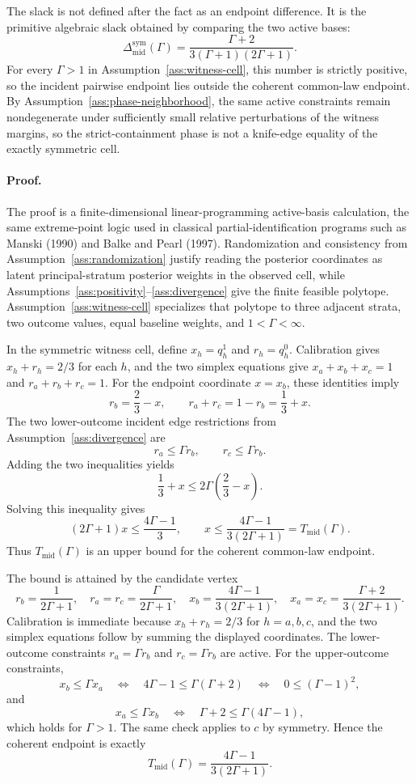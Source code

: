 The slack is not defined after the fact as an endpoint difference.  It is the primitive algebraic slack obtained by comparing the two active bases:
\[
  \Delta_{\mathrm{mid}}^{\mathrm{sym}}(\Gamma)
  =
  \frac{\Gamma+2}{3(\Gamma+1)(2\Gamma+1)}.
\]
For every \(\Gamma>1\) in Assumption~\ref{ass:witness-cell}, this number is strictly positive, so the incident pairwise endpoint lies outside the coherent common-law endpoint.  By Assumption~\ref{ass:phase-neighborhood}, the same active constraints remain nondegenerate under sufficiently small relative perturbations of the witness margins, so the strict-containment phase is not a knife-edge equality of the exactly symmetric cell.

\paragraph{Proof.}
The proof is a finite-dimensional linear-programming active-basis calculation, the same extreme-point logic used in classical partial-identification programs such as Manski (1990) and Balke and Pearl (1997).  Randomization and consistency from Assumption~\ref{ass:randomization} justify reading the posterior coordinates as latent principal-stratum posterior weights in the observed cell, while Assumptions~\ref{ass:positivity}--\ref{ass:divergence} give the finite feasible polytope.  Assumption~\ref{ass:witness-cell} specializes that polytope to three adjacent strata, two outcome values, equal baseline weights, and \(1<\Gamma<\infty\).

In the symmetric witness cell, define \(x_h=q_h^1\) and \(r_h=q_h^0\).  Calibration gives \(x_h+r_h=2/3\) for each \(h\), and the two simplex equations give \(x_a+x_b+x_c=1\) and \(r_a+r_b+r_c=1\).  For the endpoint coordinate \(x=x_b\), these identities imply
\[
  r_b=\frac23-x,\qquad r_a+r_c=1-r_b=\frac13+x.
\]
The two lower-outcome incident edge restrictions from Assumption~\ref{ass:divergence} are
\[
  r_a\le \Gamma r_b,\qquad r_c\le \Gamma r_b.
\]
Adding the two inequalities yields
\[
  \frac13+x\le 2\Gamma\left(\frac23-x\right).
\]
Solving this inequality gives
\[
  (2\Gamma+1)x\le \frac{4\Gamma-1}{3},
  \qquad
  x\le \frac{4\Gamma-1}{3(2\Gamma+1)}
  =
  T_{\mathrm{mid}}(\Gamma).
\]
Thus \(T_{\mathrm{mid}}(\Gamma)\) is an upper bound for the coherent common-law endpoint.

The bound is attained by the candidate vertex
\[
  r_b=\frac{1}{2\Gamma+1},\quad
  r_a=r_c=\frac{\Gamma}{2\Gamma+1},\quad
  x_b=\frac{4\Gamma-1}{3(2\Gamma+1)},\quad
  x_a=x_c=\frac{\Gamma+2}{3(2\Gamma+1)}.
\]
Calibration is immediate because \(x_h+r_h=2/3\) for \(h=a,b,c\), and the two simplex equations follow by summing the displayed coordinates.  The lower-outcome constraints \(r_a=\Gamma r_b\) and \(r_c=\Gamma r_b\) are active.  For the upper-outcome constraints,
\[
  x_b\le \Gamma x_a
  \quad\Longleftrightarrow\quad
  4\Gamma-1\le \Gamma(\Gamma+2)
  \quad\Longleftrightarrow\quad
  0\le(\Gamma-1)^2,
\]
and
\[
  x_a\le \Gamma x_b
  \quad\Longleftrightarrow\quad
  \Gamma+2\le \Gamma(4\Gamma-1),
\]
which holds for \(\Gamma>1\).  The same check applies to \(c\) by symmetry.  Hence the coherent endpoint is exactly
\[
  T_{\mathrm{mid}}(\Gamma)=\frac{4\Gamma-1}{3(2\Gamma+1)}.
\]

